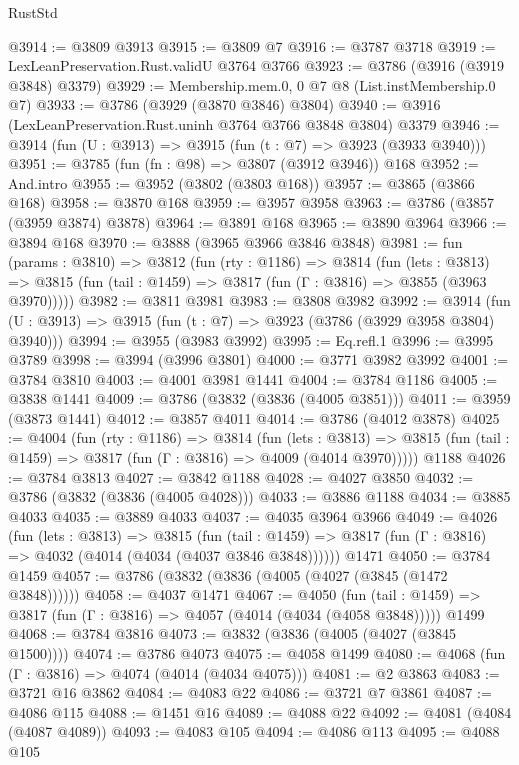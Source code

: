 \begin{lexlean}{RustStd}
\begin{coremodule}
@3914 := @3809 @3913
@3915 := @3809 @7
@3916 := @3787 @3718
@3919 := LexLeanPreservation.Rust.validU @3764 @3766
@3923 := @3786 (@3916 (@3919 @3848) @3379)
@3929 := Membership.mem.{0, 0} @7 @8 (List.instMembership.{0} @7)
@3933 := @3786 (@3929 (@3870 @3846) @3804)
@3940 := @3916 (LexLeanPreservation.Rust.uninh @3764 @3766 @3848 @3804) @3379
@3946 := @3914 (fun (U : @3913) => @3915 (fun (t : @7) => @3923 (@3933 @3940)))
@3951 := @3785 (fun (fn : @98) => @3807 (@3912 @3946)) @168
@3952 := And.intro
@3955 := @3952 (@3802 (@3803 @168))
@3957 := @3865 (@3866 @168)
@3958 := @3870 @168
@3959 := @3957 @3958
@3963 := @3786 (@3857 (@3959 @3874) @3878)
@3964 := @3891 @168
@3965 := @3890 @3964
@3966 := @3894 @168
@3970 := @3888 (@3965 @3966 @3846 @3848)
@3981 := fun (params : @3810) =>
  @3812
    (fun (rty : @1186) =>
    @3814
      (fun (lets : @3813) =>
      @3815 (fun (tail : @1459) => @3817 (fun (Γ : @3816) => @3855 (@3963 @3970)))))
@3982 := @3811 @3981
@3983 := @3808 @3982
@3992 := @3914 (fun (U : @3913) => @3915 (fun (t : @7) => @3923 (@3786 (@3929 @3958 @3804) @3940)))
@3994 := @3955 (@3983 @3992)
@3995 := Eq.refl.{1}
@3996 := @3995 @3789
@3998 := @3994 (@3996 @3801)
@4000 := @3771 @3982 @3992
@4001 := @3784 @3810
@4003 := @4001 @3981 @1441
@4004 := @3784 @1186
@4005 := @3838 @1441
@4009 := @3786 (@3832 (@3836 (@4005 @3851)))
@4011 := @3959 (@3873 @1441)
@4012 := @3857 @4011
@4014 := @3786 (@4012 @3878)
@4025 := @4004
    (fun (rty : @1186) =>
    @3814
      (fun (lets : @3813) =>
      @3815 (fun (tail : @1459) => @3817 (fun (Γ : @3816) => @4009 (@4014 @3970)))))
    @1188
@4026 := @3784 @3813
@4027 := @3842 @1188
@4028 := @4027 @3850
@4032 := @3786 (@3832 (@3836 (@4005 @4028)))
@4033 := @3886 @1188
@4034 := @3885 @4033
@4035 := @3889 @4033
@4037 := @4035 @3964 @3966
@4049 := @4026
    (fun (lets : @3813) =>
    @3815
      (fun (tail : @1459) => @3817 (fun (Γ : @3816) => @4032 (@4014 (@4034 (@4037 @3846 @3848))))))
    @1471
@4050 := @3784 @1459
@4057 := @3786 (@3832 (@3836 (@4005 (@4027 (@3845 (@1472 @3848))))))
@4058 := @4037 @1471
@4067 := @4050
    (fun (tail : @1459) => @3817 (fun (Γ : @3816) => @4057 (@4014 (@4034 (@4058 @3848)))))
    @1499
@4068 := @3784 @3816
@4073 := @3832 (@3836 (@4005 (@4027 (@3845 @1500))))
@4074 := @3786 @4073
@4075 := @4058 @1499
@4080 := @4068 (fun (Γ : @3816) => @4074 (@4014 (@4034 @4075)))
@4081 := @2 @3863
@4083 := @3721 @16 @3862
@4084 := @4083 @22
@4086 := @3721 @7 @3861
@4087 := @4086 @115
@4088 := @1451 @16
@4089 := @4088 @22
@4092 := @4081 (@4084 (@4087 @4089))
@4093 := @4083 @105
@4094 := @4086 @113
@4095 := @4088 @105

\end{coremodule}
\end{lexlean}
